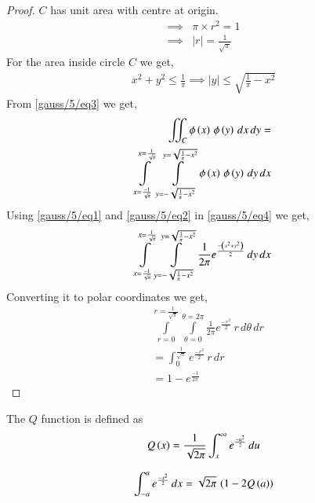     \begin{proof}
    $C$ has unit area with centre at origin.
    \begin{align}
        \implies &\pi\times r^2=1\\
        \implies &|r| = \frac{1}{\sqrt{\pi}}
    \end{align}
    For the area inside circle $C$ we get,
    \begin{align}
        x^2+y^2\leq \frac{1}{\pi}
        \implies |y| \leq \sqrt{\frac{1}{\pi}-x^2}\label{gauss/5/eq3}
    \end{align}
    From \eqref{gauss/5/eq3} we get,
    \begin{align}
        \iint_C{\phi\left(x\right)\,\phi\left(y\right)\,dx\,dy} = \nonumber\\
        \int\limits_{x=\frac{-1}{\sqrt{\pi}}}^{x=\frac{1}{\sqrt{\pi}}}\, \int\limits_{y=-\sqrt{\frac{1}{\pi}-x^2}}^{y=\sqrt{\frac{1}{\pi}-x^2}} \phi\left(x\right)\,\phi\left(y\right)\,dy\,dx \label{gauss/5/eq4}
    \end{align}
    Using \eqref{gauss/5/eq1} and \eqref{gauss/5/eq2} in \eqref{gauss/5/eq4} we get,
    \begin{align}
        \int\limits_{x=\frac{-1}{\sqrt{\pi}}}^{x=\frac{1}{\sqrt{\pi}}} \int\limits_{y=-\sqrt{\frac{1}{\pi}-x^2}}^{y=\sqrt{\frac{1}{\pi}-x^2}} \frac{1}{2\pi}e^\frac{-\left(x^2+y^2\right)}{2}\,dy\,dx
    \end{align}
    Converting it to polar coordinates we get,
    \begin{align}
        &\int\limits_{r=0}^{r=\frac{1}{\sqrt{\pi}}} \int\limits_{\theta=0}^{\theta=2\pi} \frac{1}{2\pi}e^\frac{-r^2}{2}\,r\,d\theta\,dr\\
        &= \int_{0}^{\frac{1}{\sqrt{\pi}}}e^\frac{-r^2}{2}\,r\,dr\\
        &= 1 - e^{\frac{-1}{2\pi}}
    \end{align}
    \end{proof}
    \begin{definition}
    The $Q$ function is defined as
    \begin{align}
        Q\left(x\right) = \frac{1}{\sqrt{2\pi}}\int_x^\infty e^{\frac{-u^2}{2}}\, du\label{gauss/5/eq5}
    \end{align}
    \end{definition}
    \begin{lemma}
    \begin{align}
        \int_{-a}^{a} e^{\frac{-x^2}{2}}\, dx = \sqrt{2\pi}\,\left(1-2Q\left(a\right)\right)\label{gauss/5/eq6}
    \end{align}
    \end{lemma}
